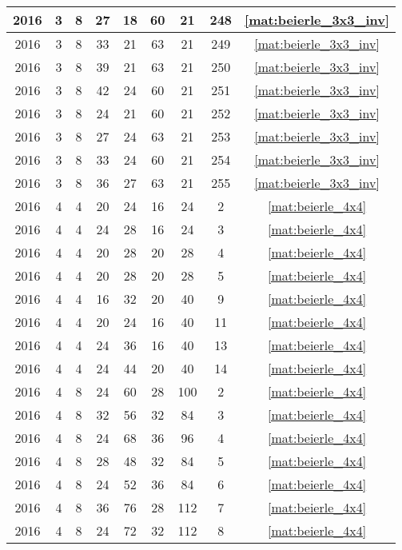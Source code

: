 \begin{longtable}{|c|c|c|c|c|c|c|c|c|}
2016 & 3 & 8 & 27 & 18 & 60 & 21 & 248 & \eqref{mat:beierle_3x3_inv} \\ \hline 
2016 & 3 & 8 & 33 & 21 & 63 & 21 & 249 & \eqref{mat:beierle_3x3_inv} \\ \hline 
2016 & 3 & 8 & 39 & 21 & 63 & 21 & 250 & \eqref{mat:beierle_3x3_inv} \\ \hline 
2016 & 3 & 8 & 42 & 24 & 60 & 21 & 251 & \eqref{mat:beierle_3x3_inv} \\ \hline 
2016 & 3 & 8 & 24 & 21 & 60 & 21 & 252 & \eqref{mat:beierle_3x3_inv} \\ \hline 
2016 & 3 & 8 & 27 & 24 & 63 & 21 & 253 & \eqref{mat:beierle_3x3_inv} \\ \hline 
2016 & 3 & 8 & 33 & 24 & 60 & 21 & 254 & \eqref{mat:beierle_3x3_inv} \\ \hline 
2016 & 3 & 8 & 36 & 27 & 63 & 21 & 255 & \eqref{mat:beierle_3x3_inv} \\ \hline 
2016 & 4 & 4 & 20 & 24 & 16 & 24 & 2 & \eqref{mat:beierle_4x4} \\ \hline 
2016 & 4 & 4 & 24 & 28 & 16 & 24 & 3 & \eqref{mat:beierle_4x4} \\ \hline 
2016 & 4 & 4 & 20 & 28 & 20 & 28 & 4 & \eqref{mat:beierle_4x4} \\ \hline 
2016 & 4 & 4 & 20 & 28 & 20 & 28 & 5 & \eqref{mat:beierle_4x4} \\ \hline 
2016 & 4 & 4 & 16 & 32 & 20 & 40 & 9 & \eqref{mat:beierle_4x4} \\ \hline 
2016 & 4 & 4 & 20 & 24 & 16 & 40 & 11 & \eqref{mat:beierle_4x4} \\ \hline 
2016 & 4 & 4 & 24 & 36 & 16 & 40 & 13 & \eqref{mat:beierle_4x4} \\ \hline 
2016 & 4 & 4 & 24 & 44 & 20 & 40 & 14 & \eqref{mat:beierle_4x4} \\ \hline 
2016 & 4 & 8 & 24 & 60 & 28 & 100 & 2 & \eqref{mat:beierle_4x4} \\ \hline 
2016 & 4 & 8 & 32 & 56 & 32 & 84 & 3 & \eqref{mat:beierle_4x4} \\ \hline 
2016 & 4 & 8 & 24 & 68 & 36 & 96 & 4 & \eqref{mat:beierle_4x4} \\ \hline 
2016 & 4 & 8 & 28 & 48 & 32 & 84 & 5 & \eqref{mat:beierle_4x4} \\ \hline 
2016 & 4 & 8 & 24 & 52 & 36 & 84 & 6 & \eqref{mat:beierle_4x4} \\ \hline 
2016 & 4 & 8 & 36 & 76 & 28 & 112 & 7 & \eqref{mat:beierle_4x4} \\ \hline 
2016 & 4 & 8 & 24 & 72 & 32 & 112 & 8 & \eqref{mat:beierle_4x4} \\ \hline 

\end{longtable}
